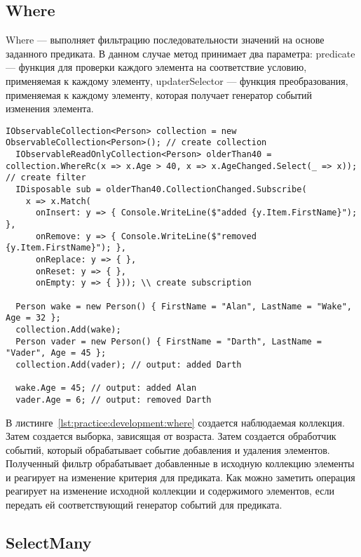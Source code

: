 \subsection{Where}
\label{sub:development:where}

Where --- выполняет фильтрацию последовательности значений на основе заданного предиката.
В данном случае метод принимает два параметра: predicate --- функция для проверки каждого элемента на соответствие условию,
применяемая к каждому элементу, updaterSelector --- функция преобразования,
применяемая к каждому элементу, которая получает генератор событий изменения элемента.

\begin{lstlisting}[style=csharpinlinestyle, caption={Пример использования Where}, label=lst:practice:development:where]
  IObservableCollection<Person> collection = new ObservableCollection<Person>(); // create collection
  IObservableReadOnlyCollection<Person> olderThan40 = collection.WhereRc(x => x.Age > 40, x => x.AgeChanged.Select(_ => x)); // create filter
  IDisposable sub = olderThan40.CollectionChanged.Subscribe(
    x => x.Match(
      onInsert: y => { Console.WriteLine($"added {y.Item.FirstName}"); },
      onRemove: y => { Console.WriteLine($"removed {y.Item.FirstName}"); },
      onReplace: y => { },
      onReset: y => { },
      onEmpty: y => { })); \\ create subscription

  Person wake = new Person() { FirstName = "Alan", LastName = "Wake", Age = 32 };
  collection.Add(wake);
  Person vader = new Person() { FirstName = "Darth", LastName = "Vader", Age = 45 };
  collection.Add(vader); // output: added Darth

  wake.Age = 45; // output: added Alan
  vader.Age = 6; // output: removed Darth
\end{lstlisting}

В листинге~\ref{lst:practice:development:where} создается наблюдаемая коллекция. Затем создается выборка, зависящая от возраста. Затем создается обработчик событий,
который обрабатывает событие добавления и удаления элементов. Полученный фильтр обрабатывает добавленные в исходную коллекцию элементы и реагирует на изменение критерия для предиката.
Как можно заметить операция реагирует на изменение исходной коллекции и содержимого элементов, если передать ей соответствующий генератор событий для предиката.

\subsection{SelectMany}
\label{sub:development:select_many}

